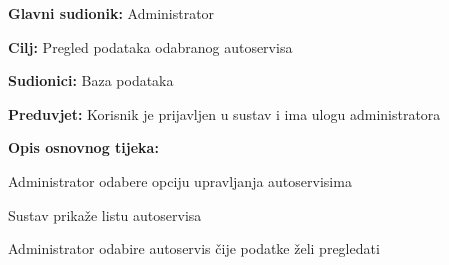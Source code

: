 	\noindent {}
\begin{packed_item}
	
	\item \textbf{Glavni sudionik: } Administrator
	\item  \textbf{Cilj:} Pregled podataka odabranog autoservisa
	\item  \textbf{Sudionici:} Baza podataka
	\item  \textbf{Preduvjet:} Korisnik je prijavljen u sustav i ima ulogu administratora
	\item  \textbf{Opis osnovnog tijeka:}
	
	\item[] \begin{packed_enum}
		
		\item Administrator odabere opciju upravljanja autoservisima
		\item Sustav prikaže listu autoservisa
		\item Administrator odabire autoservis čije podatke želi pregledati
		
	\end{packed_enum}
\end{packed_item}

